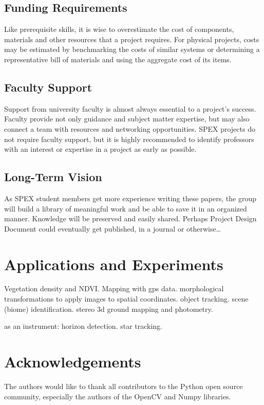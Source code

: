 \documentclass[conference]{IEEEtran} %
\begin{document}
\subsection{Funding Requirements}
Like prerequisite skills, it is wise to overestimate the cost of components, materials and other resources that a project requires.
For physical projects, costs may be estimated by benchmarking the costs of similar systems or determining a representative bill of materials and using the aggregate cost of its items.

\subsection{Faculty Support}
Support from university faculty is almost always essential to a project's success.
Faculty provide not only guidance and subject matter expertise, but may also connect a team with resources and networking opportunities.
SPEX projects do not require faculty support, but it is highly recommended to identify professors with an interest or expertise in a project as early as possible.

\subsection{Long-Term Vision}
\label{sec:vision}
As SPEX student members get more experience writing these papers, the group will build a library of meaningful work and be able to save it in an organized manner.
Knowledge will be preserved and easily shared.
Perhaps Project Design Document could eventually get published, in a journal or otherwise\ldots

\section{Applications and Experiments}
\label{sec:payloads}
Vegetation density and NDVI. Mapping with gps data. morphological transformations to apply images to spatial coordinates. object tracking. scene (biome) identification. stereo 3d ground mapping and photometry.

as an instrument: horizon detection. star tracking.

\section*{Acknowledgements}
The authors would like to thank all contributors to the Python open source community, especially the authors of the OpenCV and Numpy libraries.




\onecolumn
\appendices{}
\end{document}
